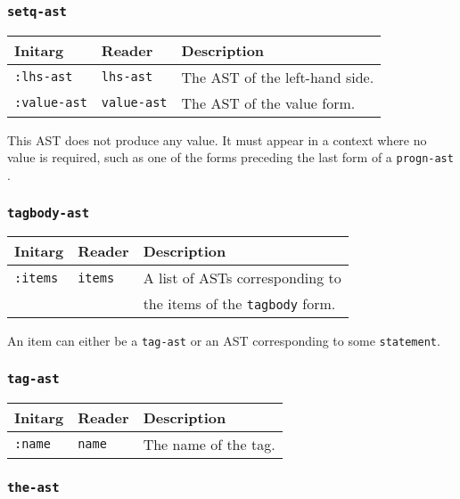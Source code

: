 \subsubsection{\texttt{setq-ast}}
\label{setq-ast}

\begin{tabular}{|l|l|l|}
\hline
Initarg & Reader & Description\\
\hline\hline
\texttt{:lhs-ast} & \texttt{lhs-ast} & The AST of the left-hand side.\\
\hline
\texttt{:value-ast} & \texttt{value-ast} & The AST of the value form.\\
\hline
\end{tabular}

This AST does not produce any value.  It must appear in a context
where no value is required, such as one of the forms preceding the
last form of a \texttt{progn-ast} .

\subsubsection{\texttt{tagbody-ast}}
\label{tagbody-ast}

\begin{tabular}{|l|l|l|}
\hline
Initarg & Reader & Description\\
\hline\hline
\texttt{:items} & \texttt{items} & A list of ASTs corresponding to\\
& & the items of the \texttt{tagbody} form. \\
\hline
\end{tabular}

An item can either be a \texttt{tag-ast} or an AST corresponding to
some \texttt{statement}. 

\subsubsection{\texttt{tag-ast}}
\label{tag-ast}

\begin{tabular}{|l|l|l|}
\hline
Initarg & Reader & Description\\
\hline\hline
\texttt{:name} & \texttt{name} & The name of the tag.\\
\hline
\end{tabular}

\subsubsection{\texttt{the-ast}}
\label{the-ast}


